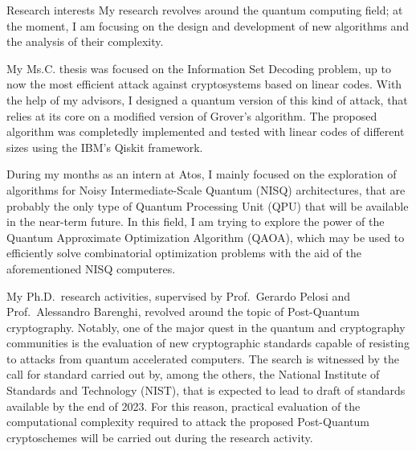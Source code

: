 \documentclass{resume} %
\begin{document}
\begin{rSection}{Research interests}
  My research revolves around the quantum computing field; at the moment, I am
  focusing on the design and development of new algorithms and the analysis of
  their complexity.

  My Ms.C. thesis was focused on the Information Set Decoding problem, up to now
  the most efficient attack against cryptosystems based on linear codes. With
  the help of my advisors, I designed a quantum version of this kind of attack,
  that relies at its core on a modified version of Grover's algorithm. The
  proposed algorithm was completedly implemented and tested with linear codes of
  different sizes using the IBM's Qiskit framework.

  During my months as an intern at Atos, I mainly focused on the exploration of
  algorithms for Noisy Intermediate-Scale Quantum (NISQ) architectures, that are
  probably the only type of Quantum Processing Unit (QPU) that will be available
  in the near-term future. In this field, I am trying to explore the power of
  the Quantum Approximate Optimization Algorithm (QAOA), which may be used to
  efficiently solve combinatorial optimization problems with the aid of the
  aforementioned NISQ computeres.

  My Ph.D.\ research activities, supervised by Prof.\ Gerardo Pelosi and Prof.\
  Alessandro Barenghi, revolved around the topic of Post-Quantum cryptography.
  Notably, one of the major quest in the quantum and cryptography communities is
  the evaluation of new cryptographic standards capable of resisting to attacks
  from quantum accelerated computers. The search is witnessed by the call for
  standard carried out by, among the others, the National Institute of Standards
  and Technology (NIST), that is expected to lead to draft of standards
  available by the end of 2023. For this reason, practical evaluation of the
  computational complexity required to attack the proposed Post-Quantum
  cryptoschemes will be carried out during the research activity.




\end{rSection}
\end{document}
